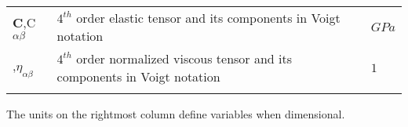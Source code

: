 \documentclass[a4paper,oneside,12pt]{book}
\begin{document}
\begin{table}[ht!]
\begin{tabular}{lp{11cm}l}
\textbf{C},C\textsubscript{$\alpha\beta$}&$4^{th}$ order elastic tensor and its components in Voigt notation&$GPa$\\
\pmb{$\eta$},$\eta_{\alpha\beta}$&$4^{th}$ order normalized viscous tensor and its components in Voigt notation&$1$\\
\\
\hline
\end{tabular}
\end{table}


The units on the rightmost column define variables when dimensional.

\mainmatter











\appendix
\renewcommand{\thechapter}{A\arabic{chapter}}

\end{document}
